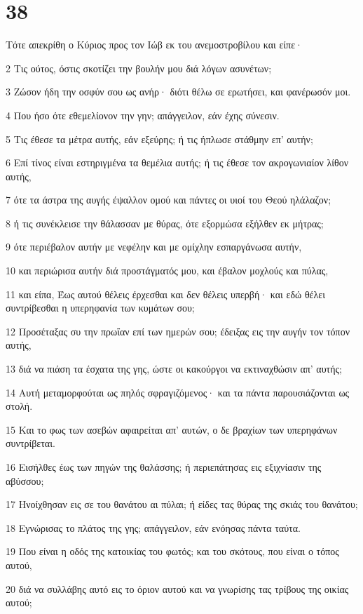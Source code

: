 \chapter{38}

\par Τότε απεκρίθη ο Κύριος προς τον Ιώβ εκ του ανεμοστροβίλου και είπε·
\par 2 Τις ούτος, όστις σκοτίζει την βουλήν μου διά λόγων ασυνέτων;
\par 3 Ζώσον ήδη την οσφύν σου ως ανήρ· διότι θέλω σε ερωτήσει, και φανέρωσόν μοι.
\par 4 Που ήσο ότε εθεμελίονον την γην; απάγγειλον, εάν έχης σύνεσιν.
\par 5 Τις έθεσε τα μέτρα αυτής, εάν εξεύρης; ή τις ήπλωσε στάθμην επ' αυτήν;
\par 6 Επί τίνος είναι εστηριγμένα τα θεμέλια αυτής; ή τις έθεσε τον ακρογωνιαίον λίθον αυτής,
\par 7 ότε τα άστρα της αυγής έψαλλον ομού και πάντες οι υιοί του Θεού ηλάλαζον;
\par 8 ή τις συνέκλεισε την θάλασσαν με θύρας, ότε εξορμώσα εξήλθεν εκ μήτρας;
\par 9 ότε περιέβαλον αυτήν με νεφέλην και με ομίχλην εσπαργάνωσα αυτήν,
\par 10 και περιώρισα αυτήν διά προστάγματός μου, και έβαλον μοχλούς και πύλας,
\par 11 και είπα, Έως αυτού θέλεις έρχεσθαι και δεν θέλεις υπερβή· και εδώ θέλει συντρίβεσθαι η υπερηφανία των κυμάτων σου;
\par 12 Προσέταξας συ την πρωΐαν επί των ημερών σου; έδειξας εις την αυγήν τον τόπον αυτής,
\par 13 διά να πιάση τα έσχατα της γης, ώστε οι κακούργοι να εκτιναχθώσιν απ' αυτής;
\par 14 Αυτή μεταμορφούται ως πηλός σφραγιζόμενος· και τα πάντα παρουσιάζονται ως στολή.
\par 15 Και το φως των ασεβών αφαιρείται απ' αυτών, ο δε βραχίων των υπερηφάνων συντρίβεται.
\par 16 Εισήλθες έως των πηγών της θαλάσσης; ή περιεπάτησας εις εξιχνίασιν της αβύσσου;
\par 17 Ηνοίχθησαν εις σε του θανάτου αι πύλαι; ή είδες τας θύρας της σκιάς του θανάτου;
\par 18 Εγνώρισας το πλάτος της γης; απάγγειλον, εάν ενόησας πάντα ταύτα.
\par 19 Που είναι η οδός της κατοικίας του φωτός; και του σκότους, που είναι ο τόπος αυτού,
\par 20 διά να συλλάβης αυτό εις το όριον αυτού και να γνωρίσης τας τρίβους της οικίας αυτού;
